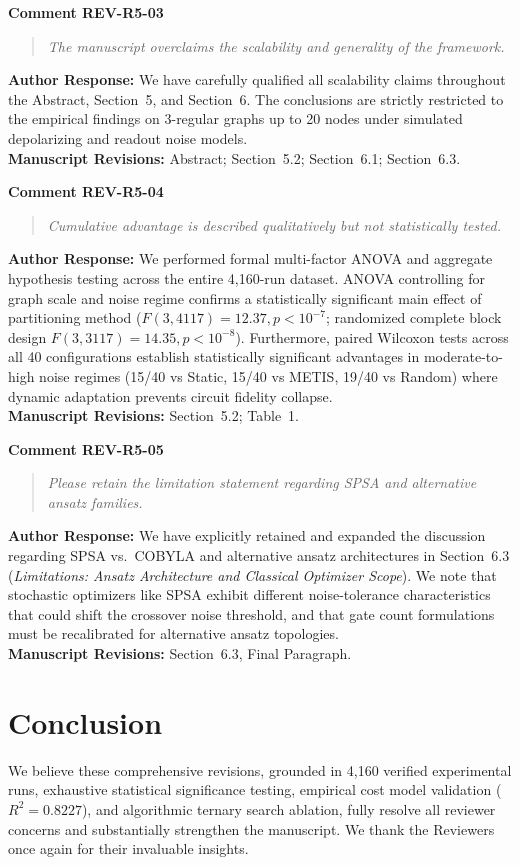 \documentclass[11pt,a4paper]{article}
\newcommand{\commentbox}[2]{
    \vspace{0.8em}
    \noindent\textbf{\textcolor{commentcolor}{#1}}
    \vspace{0.2em}
    \begin{quote}
        \small\itshape #2
    \end{quote}
}
\newcommand{\responsebox}[1]{
    \noindent\textbf{\textcolor{responsecolor}{Author Response:}} #1
    \vspace{0.8em}
}
\begin{document}
\commentbox{Comment REV-R5-03}{The manuscript overclaims the scalability and generality of the framework.}

\responsebox{We have carefully qualified all scalability claims throughout the Abstract, Section~5, and Section~6. The conclusions are strictly restricted to the empirical findings on 3-regular graphs up to 20 nodes under simulated depolarizing and readout noise models.
\\[0.3em]
\textbf{Manuscript Revisions:} Abstract; Section~5.2; Section~6.1; Section~6.3.}

\commentbox{Comment REV-R5-04}{Cumulative advantage is described qualitatively but not statistically tested.}

\responsebox{We performed formal multi-factor ANOVA and aggregate hypothesis testing across the entire 4,160-run dataset. ANOVA controlling for graph scale and noise regime confirms a statistically significant main effect of partitioning method ($F(3, 4117) = 12.37, p < 10^{-7}$; randomized complete block design $F(3, 3117) = 14.35, p < 10^{-8}$). Furthermore, paired Wilcoxon tests across all 40 configurations establish statistically significant advantages in moderate-to-high noise regimes (15/40 vs Static, 15/40 vs METIS, 19/40 vs Random) where dynamic adaptation prevents circuit fidelity collapse.
\\[0.3em]
\textbf{Manuscript Revisions:} Section~5.2; Table~1.}

\commentbox{Comment REV-R5-05}{Please retain the limitation statement regarding SPSA and alternative ansatz families.}

\responsebox{We have explicitly retained and expanded the discussion regarding SPSA vs.\ COBYLA and alternative ansatz architectures in Section~6.3 (\textit{Limitations: Ansatz Architecture and Classical Optimizer Scope}). We note that stochastic optimizers like SPSA exhibit different noise-tolerance characteristics that could shift the crossover noise threshold, and that gate count formulations must be recalibrated for alternative ansatz topologies.
\\[0.3em]
\textbf{Manuscript Revisions:} Section~6.3, Final Paragraph.}

\vspace{1.5em}
\section*{Conclusion}

We believe these comprehensive revisions, grounded in 4,160 verified experimental runs, exhaustive statistical significance testing, empirical cost model validation ($R^2 = 0.8227$), and algorithmic ternary search ablation, fully resolve all reviewer concerns and substantially strengthen the manuscript. We thank the Reviewers once again for their invaluable insights.
\end{document}
